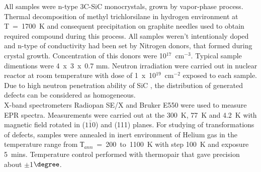 All samples were n-type 3C-SiC monocrystals, grown by vapor-phase process.  Thermal decomposition of methyl trichlorsilane in hydrogen environment at T~=~1700~K and consequent precipitation on graphite needles used to obtain required compound during this process. All samples weren't intentionaly doped and n-type of conductivity had been set by Nitrogen donors, that formed during crystal growth. Concentration of this donors were 10$^{17}$~cm$^{-3}$. Typical sample dimentions were 4~x~3~x~0.7 mm. Neutron irradiation were carried out in nuclear reactor at room temperature with dose of 1~x~10$^{19}$~cm$^{-2}$ exposed to each sample. Due to high neutron penetration ability of SiC \citep{neut}, the distribution of generated defects can be considered as homogeneous.\\
\indent X-band spectrometers Radiopan SE/X and Bruker E550 were used to measure EPR spectra. Measurements were carried out at the 300~K, 77~K and 4.2~K with magnetic field rotated in ($1\bar{1}0$) and (111) planes. For studying of transformations of defects, samples were annealed in inert environment of Helium gas in the temperature range from Т$_{ann}$~=~200~to~1100~K with step 100~K and exposure 5~mins. Temperature control performed with thermopair that gave precision about $\pm$1$\degree$.
